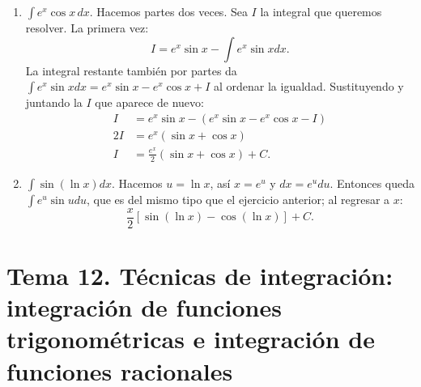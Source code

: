 \documentclass[12pt, letterpaper]{article}
\makeatletter
\renewcommand{\alph}[1]{\expandafter\@alphlatin\csname c@#1\endcsname}
\newcommand{\@alphlatin}[1]{\ifcase#1\or a\or b\or c\or d\or e\or f\or g\or h\or i\or j\or k\or l\or m\or n\or o\or p\or q\or r\or s\or t\or u\or v\or w\or x\or y\or z\else\@ctrerr\fi}
\makeatother
\begin{document}
\begin{enumerate}[label=\alph*)]
\[\begin{aligned}
  &= -x^5e^{-x}+5\int x^4e^{-x}dx\\
  &= -x^5e^{-x}-5x^4e^{-x}+20\int x^3e^{-x}dx\\
  &= -x^5e^{-x}-5x^4e^{-x}-20x^3e^{-x}+60\int x^2e^{-x}dx\\
  &= -x^5e^{-x}-5x^4e^{-x}-20x^3e^{-x}-60x^2e^{-x}+120\int xe^{-x}dx\\
  &= -x^5e^{-x}-5x^4e^{-x}-20x^3e^{-x}-60x^2e^{-x}-120xe^{-x}-120e^{-x}+C\\
  &=\boxed{-e^{-x}(x^5+5x^4+20x^3+60x^2+120x+120)+C}.
  \end{aligned}
  \]
  \item $\displaystyle\int e^x\cos x\,dx$. Hacemos partes dos veces. Sea $I$ la integral que queremos resolver. La primera vez:
  \[
  I=e^x\sin x-\int e^x\sin xdx.
  \]
  La integral restante también por partes da $\int e^x\sin xdx=e^x\sin x-e^x\cos x+I$ al ordenar la igualdad. Sustituyendo y juntando la $I$ que aparece de nuevo:
  \[
  \begin{aligned}
  I&=e^x\sin x-(e^x\sin x-e^x\cos x-I)\\
  2I&=e^x(\sin x+\cos x)\\
  I&=\boxed{\frac{e^x}{2}(\sin x+\cos x)+C}.
  \end{aligned}
  \]
  \item $\displaystyle\int\sin(\ln x)dx$. Hacemos $u=\ln x$, así $x=e^u$ y $dx=e^u du$. Entonces queda $\int e^u\sin udu$, que es del mismo tipo que el ejercicio anterior; al regresar a $x$:
  \[
  \boxed{\frac{x}{2}\left[\sin(\ln x)-\cos(\ln x)\right]+C}.
  \]
\end{enumerate}



\newpage
\section{Tema 12. Técnicas de integración: integración de funciones trigonométricas e integración de funciones racionales}
\end{document}

